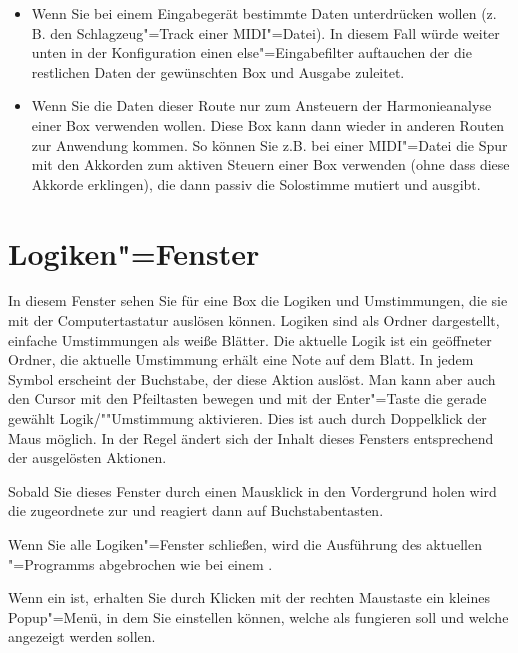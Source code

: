 \begin{itemize}
\item Wenn Sie bei einem Eingabegerät bestimmte Daten unterdrücken
  wollen (z.\,B. den Schlagzeug"=Track einer MIDI"=Datei). In diesem
  Fall würde weiter unten in der Konfiguration einen
  else"=Eingabefilter auftauchen der die restlichen Daten der
  gewünschten Box und Ausgabe zuleitet.
\item Wenn Sie die Daten dieser Route nur zum Ansteuern der
  Harmonieanalyse einer Box verwenden wollen. Diese Box kann dann
  wieder in anderen Routen zur Anwendung kommen. So können Sie z.B.
  bei einer MIDI"=Datei die Spur mit den Akkorden zum aktiven Steuern
  einer Box verwenden (ohne dass diese Akkorde erklingen), die dann
  passiv die Solostimme mutiert und ausgibt.
\end{itemize}


\section{Logiken"=Fenster}\label{sec:DE_LOGIC}
In diesem Fenster sehen Sie für eine Box die Logiken und Umstimmungen,
die sie mit der Computertastatur auslösen können. Logiken sind als
Ordner dargestellt, einfache Umstimmungen als weiße Blätter. Die
aktuelle Logik ist ein geöffneter Ordner, die aktuelle Umstimmung
erhält eine Note auf dem Blatt. In jedem Symbol erscheint der
Buchstabe, der diese Aktion auslöst. Man kann aber auch den Cursor mit
den Pfeiltasten bewegen und mit der Enter"=Taste die gerade gewählt
Logik/""Umstimmung aktivieren.  Dies ist auch durch Doppelklick der Maus
möglich. In der Regel ändert sich der Inhalt dieses Fensters
entsprechend der ausgelösten Aktionen.


Sobald Sie dieses Fenster durch einen Mausklick in den Vordergrund
holen wird die zugeordnete  zur
 und reagiert dann auf
Buchstabentasten.


Wenn Sie alle Logiken"=Fenster schließen, wird die Ausführung des
aktuellen \mutabor{}"=Programms abgebrochen wie bei einem
.


Wenn ein 
 ist, erhalten Sie durch Klicken
mit der rechten Maustaste ein kleines Popup"=Menü, in dem Sie
einstellen können, welche  als
 fungieren soll und welche
 angezeigt werden sollen.

